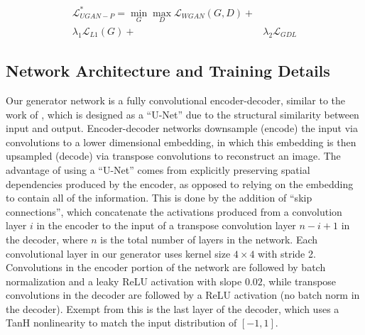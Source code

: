 \documentclass[letterpaper, 10pt, conference]{ieeeconf}
\begin{document}
\begin{equation}
   \begin{aligned}
      \mathcal{L}_{UGAN-P}^* = \min\limits_{G}\max\limits_{D} \mathcal{L}_{WGAN}(G,D) + & \\
      \lambda_{1} \mathcal{L}_{L1}(G) + & \lambda_{2} \mathcal{L}_{GDL}
   \end{aligned}
\end{equation}


\subsection{Network Architecture and Training Details}
Our generator network is a fully convolutional encoder-decoder, similar to the work of \cite{isola2016image}, which is
designed as a ``U-Net'' \cite{ronneberger2015u} due to the structural similarity between input and output.
Encoder-decoder networks downsample (encode) the input via convolutions to a lower dimensional embedding, in which
this embedding is then upsampled (decode) via transpose convolutions to reconstruct an image. The advantage of using
a ``U-Net'' comes from explicitly preserving spatial dependencies produced by the encoder, as opposed to relying on the
embedding to contain all of the information. This is done by the addition of ``skip connections'', which concatenate
the activations produced from a convolution layer $i$ in the encoder to the input of a transpose convolution layer
$n-i+1$ in the decoder, where $n$ is the total number of layers in the network. Each convolutional layer in our
generator uses kernel size $4 \times 4$ with stride 2. Convolutions in the encoder portion of the network are followed
by batch normalization \cite{pmlr-v37-ioffe15} and a leaky ReLU activation with slope $0.02$, while transpose
convolutions in the decoder are followed by a ReLU activation \cite{nair2010rectified} (no batch norm in the decoder).
Exempt from this is the last layer of the decoder, which uses a TanH nonlinearity to match the input distribution of
$[-1, 1]$. 
\end{document}
